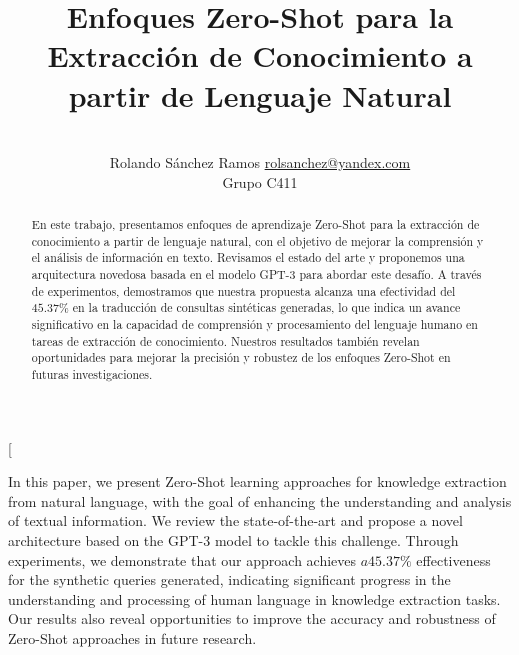 \documentclass[a4paper,10pt,twocolumn]{article}
\title{Enfoques Zero-Shot para la Extracción de Conocimiento a partir de Lenguaje Natural}
\author{\\
\name Rolando S\'anchez Ramos \email \href{mailto:rolsanchez@yandex.com}{rolsanchez@yandex.com}
	\\ \addr Grupo C411}
\begin{document}
\twocolumn[

\maketitle


\begin{abstract}

	En este trabajo, presentamos enfoques de aprendizaje Zero-Shot para la extracción de conocimiento a partir de lenguaje natural, con el objetivo de mejorar la comprensión y el análisis de información en texto. Revisamos el estado del arte y proponemos una arquitectura novedosa basada en el modelo GPT-3 para abordar este desafío. A través de experimentos, demostramos que nuestra propuesta alcanza una efectividad del $45.37\%$ en la traducción de consultas sintéticas generadas, lo que indica un avance significativo en la capacidad de comprensión y procesamiento del lenguaje humano en tareas de extracción de conocimiento. Nuestros resultados también revelan oportunidades para mejorar la precisión y robustez de los enfoques Zero-Shot en futuras investigaciones.

\end{abstract}

\vspace{0.5cm}

\begin{enabstract}

	In this paper, we present Zero-Shot learning approaches for knowledge extraction from natural language, with the goal of enhancing the understanding and analysis of textual information. We review the state-of-the-art and propose a novel architecture based on the GPT-3 model to tackle this challenge. Through experiments, we demonstrate that our approach achieves $a 45.37\%$ effectiveness for the synthetic queries generated, indicating significant progress in the understanding and processing of human language in knowledge extraction tasks. Our results also reveal opportunities to improve the accuracy and robustness of Zero-Shot approaches in future research.

\end{enabstract}
\end{document}
